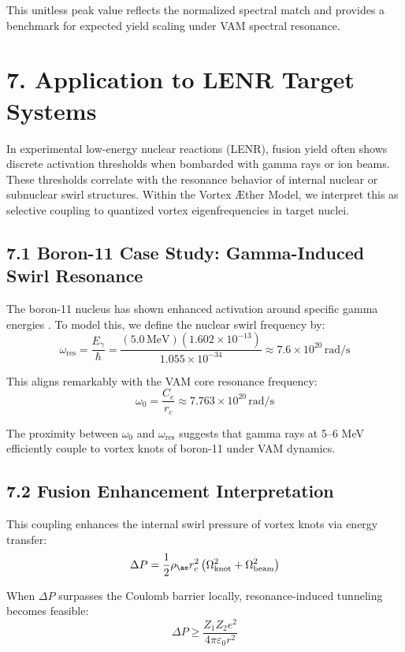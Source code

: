 This unitless peak value reflects the normalized spectral match and provides a benchmark for expected yield scaling under VAM spectral resonance.
\section*{7. Application to LENR Target Systems}

In experimental low-energy nuclear reactions (LENR), fusion yield often shows discrete activation thresholds when bombarded with gamma rays or ion beams. These thresholds correlate with the resonance behavior of internal nuclear or subnuclear swirl structures. Within the Vortex Æther Model, we interpret this as selective coupling to quantized vortex eigenfrequencies in target nuclei.

\subsection*{7.1 Boron-11 Case Study: Gamma-Induced Swirl Resonance}

The boron-11 nucleus has shown enhanced activation around specific gamma energies \cite{Goryachev2020}. To model this, we define the nuclear swirl frequency by:
\begin{equation}
\omega_{\text{res}} = \frac{E_{\gamma}}{\hbar} = \frac{(5.0 \, \text{MeV})(1.602 \times 10^{-13})}{1.055 \times 10^{-34}} \approx 7.6 \times 10^{20} \, \text{rad/s}
\end{equation}

This aligns remarkably with the VAM core resonance frequency:
\[ \omega_0 = \frac{C_e}{r_c} \approx 7.763 \times 10^{20} \, \text{rad/s} \]

The proximity between $\omega_0$ and $\omega_{\text{res}}$ suggests that gamma rays at 5--6 MeV efficiently couple to vortex knots of boron-11 under VAM dynamics.

\subsection*{7.2 Fusion Enhancement Interpretation}

This coupling enhances the internal swirl pressure of vortex knots via energy transfer:
\begin{equation}
\Delta P = \frac{1}{2} \rho_{\ae} r_c^2 \left( \Omega_{\text{knot}}^2 + \Omega_{\text{beam}}^2 \right)
\end{equation}

When $\Delta P$ surpasses the Coulomb barrier locally, resonance-induced tunneling becomes feasible:
\begin{equation}
\Delta P \geq \frac{Z_1 Z_2 e^2}{4\pi \varepsilon_0 r^2}
\end{equation}

